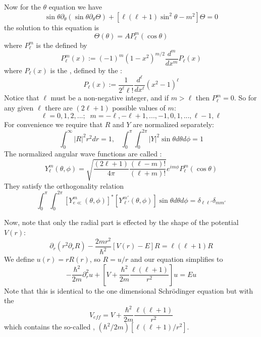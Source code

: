 \documentclass[12pt, a4paper, oneside, openright, titlepage]{book}
\begin{document}
Now for the $\theta$ equation we have \begin{equation*}
    \sin\theta\partial_{\theta}(\sin\theta\partial_{\theta}\Theta) + \left[\ell(\ell+1)\sin^2\theta-m^2\right]\Theta = 0
\end{equation*}
the solution to this equation is \begin{equation*}
    \Theta(\theta) = AP_{\ell}^m(\cos\theta)
\end{equation*}
where $P_{\ell}^m$ is the  defined by \begin{equation*}
    P_{\ell}^m(x) := (-1)^m(1-x^2)^{m/2}\frac{d^m}{dx^m}P_{\ell}(x)
\end{equation*}
where $P_{\ell}(x)$ is the , defined by the : \begin{equation*}
    P_{\ell}(x) := \frac{1}{2^{\ell}\ell!} \frac{d^{\ell}}{dx^{\ell}}(x^2-1)^{\ell}
\end{equation*}
Notice that $\ell$ must be a non-negative integer, and if $m > \ell$ then $P_{\ell}^m = 0$. So for any given $\ell$ there are $(2\ell+1)$ possible values of $m$:\begin{equation*}
    \ell=0,1,2,...;\;\;m=-\ell,-\ell+1,...,-1,0,1,...,\ell-1,\ell
\end{equation*}
For convenience we require that $R$ and $Y$ are normalized separately: \begin{equation*}
    \int_0^{\infty}|R|^2r^2dr = 1,\;\;\;\int_0^{\pi}\int_0^{2\pi}|Y|^2\sin\theta d\theta d\phi = 1
\end{equation*}
The normalized angular wave functions are called :\begin{equation*}
    \boxed{Y_{\ell}^m(\theta,\phi) = \sqrt{\frac{(2\ell+1)}{4\pi}\frac{(\ell-m)!}{(\ell+m)!}}e^{im\phi}P_{\ell}^m(\cos\theta)}
\end{equation*}
They satisfy the orthogonality relation \begin{equation*}
    \int_0^{\pi}\int_0^{2\pi}[Y_{e\ll}^m(\theta,\phi)]^*\left[Y_{\ell'}^{m'}(\theta,\phi)\right]\sin\theta d\theta d\phi = \delta_{\ell\ell'}\delta_{mm'}
\end{equation*}


Now, note that only the radial part is effected by the shape of the potential $V(r)$:\begin{equation*}
    \partial_r(r^2\partial_rR) - \frac{2mr^2}{\hbar^2}[V(r)-E]R = \ell(\ell+1)R
\end{equation*}
We define $u(r) = rR(r)$, so $R = u/r$ and our equation simplifies to \begin{equation*}
    -\frac{\hbar^2}{2m}\partial_r^2u + \left[V +\frac{\hbar^2}{2m}\frac{\ell(\ell+1)}{r^2}\right]u = Eu
\end{equation*}
Note that this is identical to the one dimensional Schr\"{o}dinger equation but with the  \begin{equation*}
    V_{eff} = V + \frac{\hbar^2}{2m}\frac{\ell(\ell+1)}{r^2}
\end{equation*}
which contains the so-called , $(\hbar^2/2m)[\ell(\ell+1)/r^2]$.
\end{document}
